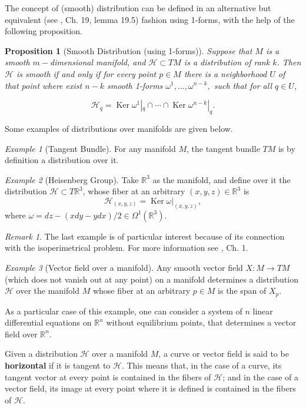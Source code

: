 \documentclass[12pt, letterpaper, reqno]{amsart}
\theoremstyle{definition}
\theoremstyle{plain}
\newtheorem{prop}{Proposition}
\theoremstyle{remark}
\newtheorem{ex}{Example}
\newtheorem{rem}{Remark}
\begin{document}
The concept of (smooth) distribution can be defined in an alternative but equivalent (see \cite{lee2003introduction}, Ch. 19, lemma 19.5) fashion using 1-forms, with the help of the following proposition.

\begin{prop}[Smooth Distribution (using 1-forms)]
	Suppose that $ M $ is a smooth $ m- $dimensional manifold, and $ \mathcal{H} \subset TM$ is a distribution of rank $k$. Then $ \mathcal{H} $ is smooth if and only if for every point $ p\in M $ there is a neighborhood $ U $ of that point where exist $n-k$ smooth 1-forms $ \omega^1,\dots,\omega^{n-k}, $ such that for all $ q\in U $,

	$$ \mathcal{H}_q = \operatorname{Ker} \omega^1|_q\cap \cdots \cap\operatorname{Ker} \omega^{n-k}|_q.  $$ 
\end{prop}

Some examples of distributions over manifolds are given below.
\begin{ex}[Tangent Bundle]
	For any manifold $ M $, the tangent bundle $ TM $ is by definition a distribution over it. 
\end{ex}
\begin{ex}[Heisenberg Group]\label{ex:heis_group}
	Take $ \mathbb{R} ^3 $ as the manifold, and define over it the distribution $ \mathcal{H}\subset T \mathbb{R} ^3 $, whose fiber at an arbitrary $ (x,y,z)\in \mathbb{R}^3  $ is   
	$$ \mathcal{H}_{(x,y,z)} = \operatorname{Ker} \omega|_{(x,y,z)},$$
	where $ \omega = dz-(x dy-y dx)/2\in\Omega^1( \mathbb{R}^3).$ 
\end{ex}
\begin{rem}
	The last example is of particular interest because of its connection with the isoperimetrical problem. For more information see \cite{montgomery2002tour}, Ch. 1.
\end{rem}
\begin{ex}[Vector field over a manifold]\label{ex:vect_field}
Any smooth vector field $ X: M \rightarrow {TM} $ (which does not vanish out at any point) on a manifold determines a distribution $ \mathcal{H}$ over the manifold $ M $ whose fiber at an arbitrary $ p\in M $ is the span of $ X_p. $

As a particular case of this example, one can consider a system of $ n $ linear differential equations on $ \mathbb{R}^n $ without equilibrium points, that determines a vector field over $ \mathbb{R}^n.$
\end{ex}


Given a distribution $ \mathcal{H} $  over a manifold $M$,  a curve or vector field is said to be \textbf{horizontal} if it is tangent to $ \mathcal{H} $. This means that, in the case of a curve, its tangent vector at every point is contained in the fibers of $ \mathcal{H} $; and in the case of a vector field, its image at every point where it is defined is contained in the fibers of $ \mathcal{H} .$   
\end{document}
